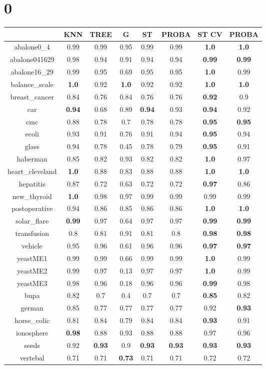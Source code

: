 \documentclass{article}%
\begin{document}
%
\normalsize%
\section*{0}%
\begin{tabular}{c|ccccccc}%
\hline%
&KNN&TREE&G&ST&PROBA&ST CV&PROBA\\%
\hline%
abalone0\_4&0.99&0.99&0.95&0.99&0.99&\textbf{1.0}&\textbf{1.0}\\%
\hline%
abalone041629&0.98&0.94&0.91&0.94&0.94&\textbf{0.99}&\textbf{0.99}\\%
\hline%
abalone16\_29&0.99&0.95&0.69&0.95&0.95&\textbf{1.0}&0.99\\%
\hline%
balance\_scale&\textbf{1.0}&0.92&\textbf{1.0}&0.92&0.92&\textbf{1.0}&\textbf{1.0}\\%
\hline%
breast\_cancer&0.84&0.76&0.84&0.76&0.76&\textbf{0.92}&0.9\\%
\hline%
car&\textbf{0.94}&0.68&0.89&\textbf{0.94}&0.93&\textbf{0.94}&0.92\\%
\hline%
cmc&0.88&0.78&0.7&0.78&0.78&\textbf{0.95}&\textbf{0.95}\\%
\hline%
ecoli&0.93&0.91&0.76&0.91&0.94&\textbf{0.95}&0.94\\%
\hline%
glass&0.94&0.78&0.45&0.78&0.79&\textbf{0.95}&0.91\\%
\hline%
haberman&0.85&0.82&0.93&0.82&0.82&\textbf{1.0}&0.97\\%
\hline%
heart\_cleveland&\textbf{1.0}&0.88&0.83&0.88&0.88&\textbf{1.0}&\textbf{1.0}\\%
\hline%
hepatitis&0.87&0.72&0.63&0.72&0.72&\textbf{0.97}&0.86\\%
\hline%
new\_thyroid&\textbf{1.0}&0.98&0.97&0.99&0.99&0.99&0.99\\%
\hline%
postoperative&0.94&0.86&0.85&0.86&0.86&\textbf{1.0}&\textbf{1.0}\\%
\hline%
solar\_flare&\textbf{0.99}&0.97&0.64&0.97&0.97&\textbf{0.99}&\textbf{0.99}\\%
\hline%
transfusion&0.8&0.81&0.91&0.81&0.8&\textbf{0.98}&\textbf{0.98}\\%
\hline%
vehicle&0.95&0.96&0.61&0.96&0.96&\textbf{0.97}&\textbf{0.97}\\%
\hline%
yeastME1&0.99&0.99&0.66&0.99&0.99&\textbf{1.0}&0.99\\%
\hline%
yeastME2&0.99&0.97&0.13&0.97&0.97&\textbf{1.0}&0.99\\%
\hline%
yeastME3&0.98&0.96&0.18&0.96&0.96&\textbf{0.99}&0.98\\%
\hline%
bupa&0.82&0.7&0.4&0.7&0.7&\textbf{0.85}&0.82\\%
\hline%
german&0.85&0.77&0.77&0.77&0.77&0.92&\textbf{0.93}\\%
\hline%
horse\_colic&0.81&0.84&0.79&0.84&0.84&\textbf{0.93}&0.91\\%
\hline%
ionosphere&\textbf{0.98}&0.88&0.93&0.88&0.88&0.97&0.96\\%
\hline%
seeds&0.92&\textbf{0.93}&0.9&\textbf{0.93}&\textbf{0.93}&\textbf{0.93}&\textbf{0.93}\\%
\hline%
vertebal&0.71&0.71&\textbf{0.73}&0.71&0.71&0.72&0.72\\%
\hline%
\end{tabular}
\end{document}
